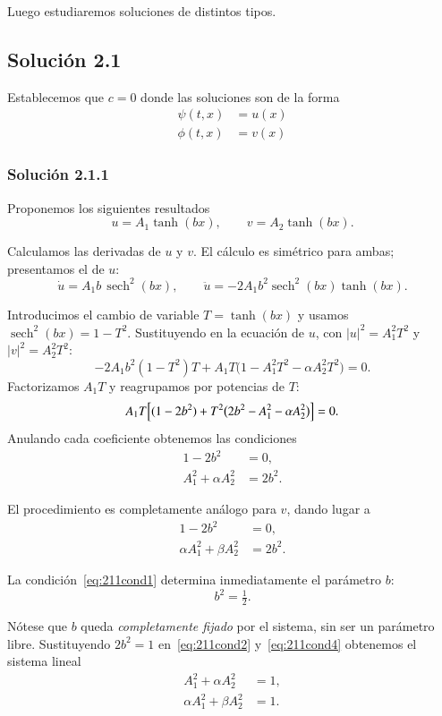 \documentclass[letterpaper,11pt]{exam}
\newcommand{\sech}{\operatorname{sech}}
\theoremstyle{plain}
\begin{document}
Luego estudiaremos soluciones de distintos tipos.

\subsection{Solución 2.1}\label{sec:sol21}
Establecemos que $c=0$ donde las soluciones son de la forma
\begin{align*}
    \psi(t,x)&=u(x)\\
    \phi(t,x)&=v(x)
\end{align*}

\subsubsection{Solución 2.1.1}\label{sec:sol211}

Proponemos los siguientes resultados
\[
  u = A_1 \tanh(bx), \qquad v = A_2 \tanh(bx).
\]

Calculamos las derivadas de $u$ y $v$. El cálculo es simétrico para ambas; presentamos el de $u$:
\[
  \dot{u}  = A_1 b\,\sech^2(bx),
  \qquad
  \ddot{u} = -2A_1 b^2\sech^2(bx)\tanh(bx).
\]

Introducimos el cambio de variable $T = \tanh(bx)$ y usamos $\sech^2(bx) = 1 - T^2$.
Sustituyendo en la ecuación de $u$, con $|u|^2 = A_1^2 T^2$ y $|v|^2 = A_2^2 T^2$:
\[
  -2A_1 b^2(1-T^2)T + A_1 T\bigl(1 - A_1^2 T^2 - \alpha A_2^2 T^2\bigr) = 0.
\]
Factorizamos $A_1 T$ y reagrupamos por potencias de $T$:
\[
  A_1 T\Bigl[(1 - 2b^2) + T^2\bigl(2b^2 - A_1^2 - \alpha A_2^2\bigr)\Bigr] = 0.
\]
Anulando cada coeficiente obtenemos las condiciones
\begin{align}
  1 - 2b^2 &= 0, \label{eq:211cond1}\\
  A_1^2 + \alpha A_2^2 &= 2b^2. \label{eq:211cond2}
\end{align}

El procedimiento es completamente análogo para $v$, dando lugar a
\begin{align}
  1 - 2b^2 &= 0, \label{eq:211cond3}\\
  \alpha A_1^2 + \beta A_2^2 &= 2b^2. \label{eq:211cond4}
\end{align}

La condición~\eqref{eq:211cond1} determina inmediatamente el parámetro $b$:
\[
  \boxed{b^2 = \tfrac{1}{2}.}
\]

Nótese que $b$ queda \emph{completamente fijado} por el sistema, sin ser un parámetro libre.
Sustituyendo $2b^2 = 1$ en~\eqref{eq:211cond2} y~\eqref{eq:211cond4} obtenemos el sistema lineal
\begin{align*}
  A_1^2 + \alpha A_2^2 &= 1,\\
  \alpha A_1^2 + \beta A_2^2 &= 1.
\end{align*}
\end{document}
